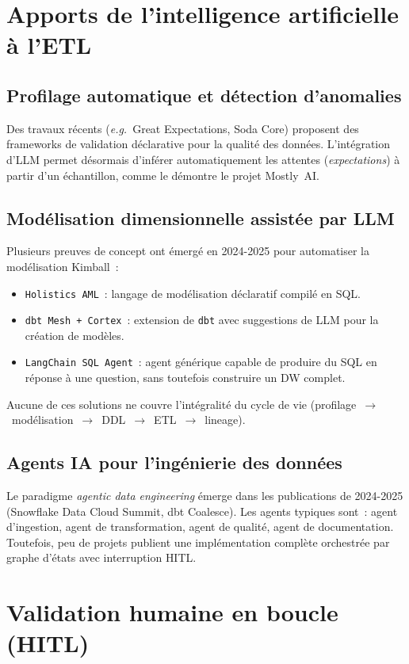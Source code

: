 \documentclass[12pt, a4paper]{report}
\begin{document}
\section{Apports de l'intelligence artificielle à l'ETL}

\subsection{Profilage automatique et détection d'anomalies}
Des travaux récents (\textit{e.g.}\ Great Expectations, Soda Core)
proposent des frameworks de validation déclarative pour la
qualité des données. L'intégration d'\ac{LLM} permet désormais
d'inférer automatiquement les attentes (\emph{expectations}) à
partir d'un échantillon, comme le démontre le projet Mostly~AI.

\subsection{Modélisation dimensionnelle assistée par LLM}
Plusieurs preuves de concept ont émergé en 2024-2025 pour automatiser
la modélisation Kimball~:
\begin{itemize}
  \item \texttt{Holistics AML}~: langage de modélisation déclaratif
        compilé en \ac{SQL}.
  \item \texttt{dbt Mesh + Cortex}~: extension de \texttt{dbt} avec
        suggestions de \ac{LLM} pour la création de modèles.
  \item \texttt{LangChain SQL Agent}~: agent générique capable de
        produire du \ac{SQL} en réponse à une question, sans
        toutefois construire un \ac{DW} complet.
\end{itemize}
Aucune de ces solutions ne couvre l'intégralité du cycle de vie
(profilage~$\to$~modélisation~$\to$~\ac{DDL}~$\to$~ETL~$\to$~lineage).

\subsection{Agents IA pour l'ingénierie des données}
Le paradigme \emph{agentic data engineering} émerge dans les
publications de 2024-2025 (Snowflake Data Cloud Summit, dbt Coalesce).
Les agents typiques sont~: agent d'ingestion, agent de transformation,
agent de qualité, agent de documentation. Toutefois, peu de projets
publient une implémentation complète orchestrée par graphe d'états
avec interruption \ac{HITL}.

\section{Validation humaine en boucle (HITL)}
\end{document}
